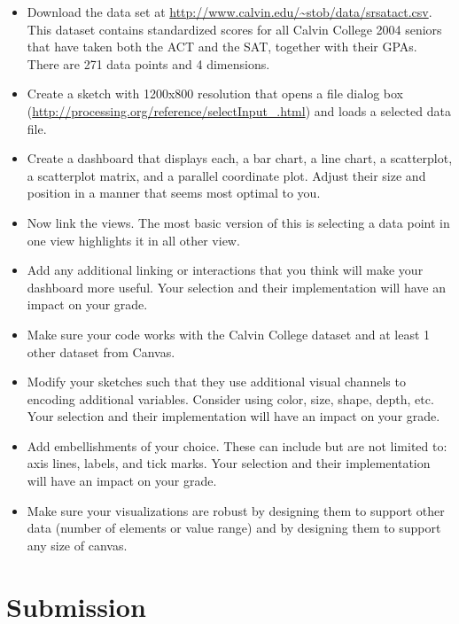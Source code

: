 \documentclass[a4paper,12pt]{article}
\begin{document}
\begin{itemize}

\item Download the data set at \url{
http://www.calvin.edu/~stob/data/srsatact.csv}. This dataset contains standardized scores for all Calvin College 2004 seniors that have taken both the ACT and the SAT, together with their GPAs. There are 271 data points and 4 dimensions.

\item Create a sketch with 1200x800 resolution that opens a file dialog box (\url{http://processing.org/reference/selectInput_.html}) and loads a selected data file. 

\item Create a dashboard that displays each, a bar chart, a line chart, a scatterplot, a scatterplot matrix, and a parallel coordinate plot. Adjust their size and position in a manner that seems most optimal to you. 

\item Now link the views. The most basic version of this is selecting a data point in one view highlights it in all other view.

\item Add any additional linking or interactions that you think will make your dashboard more useful. Your selection and their implementation will have an impact on your grade.

\item Make sure your code works with the Calvin College dataset and at least 1 other dataset from Canvas.

\item Modify your sketches such that they use additional visual channels to encoding additional variables. Consider using color, size, shape, depth, etc. Your selection and their implementation will have an impact on your grade.

\item Add embellishments of your choice. These can include but are not limited to: axis lines, labels, and tick marks. Your selection and their implementation will have an impact on your grade.

\item Make sure your visualizations are robust by designing them to support other data (number of elements or value range) and by designing them to support any size of canvas.

\end{itemize}


\section{Submission}
\end{document}
